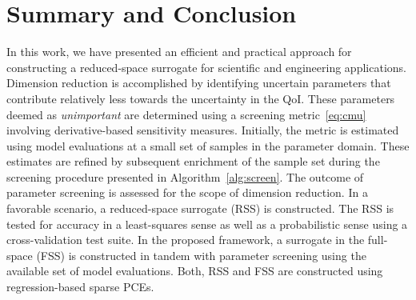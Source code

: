 \section{Summary and Conclusion}
\label{sec:disc}


In this work, we have presented an efficient and practical approach for constructing
a reduced-space
surrogate for scientific and engineering applications. Dimension reduction is accomplished
by identifying uncertain parameters that contribute relatively less towards the uncertainty
in the QoI. These parameters deemed as \textit{unimportant} are determined
using a screening metric~\eqref{eq:cmu} involving derivative-based sensitivity
measures. Initially, the metric is estimated
using model evaluations at a small set of samples in the parameter domain. These
estimates are refined by subsequent enrichment of the sample set during the screening
procedure presented in Algorithm~\ref{alg:screen}. The outcome of parameter screening is
assessed for the scope of dimension reduction. In a favorable scenario, a reduced-space
surrogate (RSS) is constructed. The RSS is tested for accuracy in a least-squares sense
as well as a probabilistic sense using a cross-validation test suite. In the proposed framework,
a surrogate in the full-space (FSS) is constructed in tandem with parameter screening using
the available set of model evaluations. Both, RSS and FSS are
constructed using regression-based sparse PCEs. 

